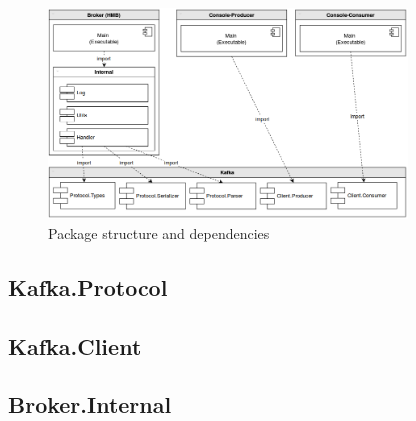 \begin{figure}[H]
    \centering
   \includegraphics[width=0.85\textwidth]{images/logical-architecture.png}
    \caption{Package structure and dependencies}
    \label{fig:logical-architecture}
\end{figure}

\subsection{Kafka.Protocol}

\subsection{Kafka.Client}

\subsection{Broker.Internal}




